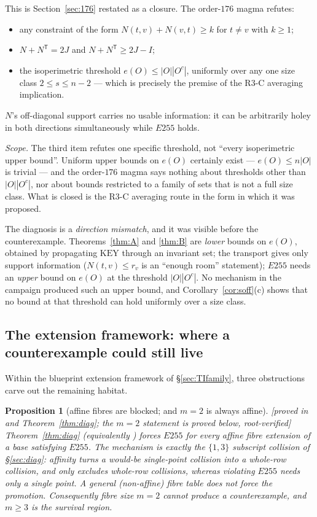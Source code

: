 \documentclass[11pt]{article}
\theoremstyle{plain}
\newtheorem{proposition}[theorem]{Proposition}
\theoremstyle{definition}
\theoremstyle{remark}
\numberwithin{equation}{section}
\newcommand{\statusbox}[1]{{\small\sloppy\textsf{[#1]}}}
\newcommand{\PROVED}[1]{\statusbox{proved in #1, root-verified}}
\begin{document}
This is Section~\ref{sec:176} restated as a closure. The order-$176$ magma refutes:
\begin{itemize}
\item any constraint of the form $N(t,v)+N(v,t)\ge k$ for $t\ne v$ with $k\ge1$;
\item $N+N^{\mathsf T} = 2J$ and $N+N^{\mathsf T}\ge 2J-I$;
\item the isoperimetric threshold $e(O)\le|O||O^c|$, uniformly over any one size class
$2\le s\le n-2$ --- which is precisely the premise of the R3-C averaging implication.
\end{itemize}
$N$'s off-diagonal support carries no usable information: it can be arbitrarily holey in both
directions simultaneously while $E255$ holds.

\emph{Scope.} The third item refutes one specific threshold, not ``every isoperimetric upper
bound''. Uniform upper bounds on $e(O)$ certainly exist --- $e(O)\le n|O|$ is trivial ---
and the order-$176$ magma says nothing about thresholds other than $|O||O^c|$, nor about
bounds restricted to a family of sets that is not a full size class. What is closed is the
R3-C averaging route in the form in which it was proposed.

The diagnosis is a \emph{direction mismatch}, and it was visible before the counterexample.
Theorems~\ref{thm:A} and \ref{thm:B} are \emph{lower} bounds on $e(O)$, obtained by
propagating $\mathrm{KEY}$ through an invariant set; the transport gives only support
information ($N(t,v)\le r_v$ is an ``enough room'' statement); $E255$ needs an \emph{upper}
bound on $e(O)$ at the threshold $|O||O^c|$. No mechanism in the campaign produced such an
upper bound, and Corollary~\ref{cor:soff}(c) shows that no bound at that threshold can hold
uniformly over a size class.

\subsection{The extension framework: where a counterexample could still live}\label{sec:blockextension}

Within the blueprint extension framework of \S\ref{sec:TIfamily}, three obstructions carve out
the remaining habitat.

\begin{proposition}[affine fibres are blocked; and $m=2$ is always affine]\label{prop:affinefibre}
\PROVED{\cite[Lemma~13.4]{blueprint} and Theorem~\ref{thm:diag}; the $m=2$ statement is
proved below}
Theorem~\ref{thm:diag} (equivalently \cite[Lemma~13.4]{blueprint}) forces $E255$ for every
affine fibre extension of a base satisfying $E255$. The mechanism is exactly the $\{1,3\}$
subscript collision of \S\ref{sec:diag}: affinity turns a would-be single-point collision into
a whole-row collision, and \cite[Lemma~13.4]{blueprint} only excludes whole-row collisions,
whereas violating $E255$ needs only a single point. A general (non-affine) fibre table does
not force the promotion. Consequently \emph{fibre size $m=2$ cannot produce a counterexample,
and $m\ge3$ is the survival region.}
\end{proposition}
\end{document}
